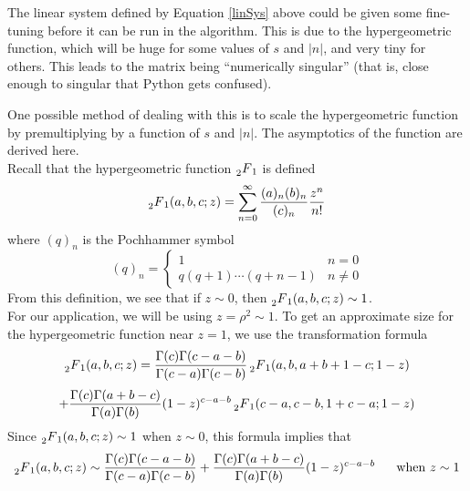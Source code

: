 \documentclass[]{article}
\begin{document}
The linear system defined by Equation \ref{linSys} above could be given some fine-tuning before it can be run in the algorithm.
This is due to the hypergeometric function, which will be huge for some values of $s$ and $|n|$, and very tiny for others.
This leads to the matrix being ``numerically singular'' (that is, close enough to singular that Python gets confused).

One possible method of dealing with this is to scale the hypergeometric function by premultiplying by a function of $s$ and $|n|$.
The asymptotics of the function are derived here.
\\

Recall that the hypergeometric function $\prescript{}{2}{F}_1$ is defined
$$
\prescript{}{2}{F}_1(a, b, c; z) = \sum_{n=0}^{\infty}\frac{(a)_n(b)_n}{(c)_n}\frac{z^n}{n!}
$$
where $(q)_n$ is the Pochhammer symbol
\[
	(q)_n =
	\begin{cases}
		1 & n = 0 \\
		q(q+1)\cdots(q+n-1) & n \neq 0
	\end{cases}
\]
From this definition, we see that if $z \sim 0$, then $\prescript{}{2}{F}_1(a, b, c; z) \sim 1$.
\\

For our application, we will be using $z = \rho^2 \sim 1$.
To get an approximate size for the hypergeometric function near $z = 1$, we use the transformation formula
$$
\prescript{}{2}{F}_1(a, b, c; z) =
\frac{\Gamma(c)\Gamma(c-a-b)}{\Gamma(c-a)\Gamma(c-b)}\prescript{}{2}{F}_1(a, b, a+b+1-c; 1-z) $$$$ + \frac{\Gamma(c)\Gamma(a+b-c)}{\Gamma(a)\Gamma(b)}(1-z)^{c-a-b}\prescript{}{2}{F}_1(c-a, c-b, 1+c-a; 1-z)
$$
Since $\prescript{}{2}{F}_1(a, b, c; z) \sim 1$ when $z \sim 0$, this formula implies that
\begin{equation}\label{zSim1}
\prescript{}{2}{F}_1(a, b, c; z) \sim
\frac{\Gamma(c)\Gamma(c-a-b)}{\Gamma(c-a)\Gamma(c-b)} +
\frac{\Gamma(c)\Gamma(a+b-c)}{\Gamma(a)\Gamma(b)}(1-z)^{c-a-b} ~~~~~\text{when}~ z \sim 1
\end{equation}
\end{document}
